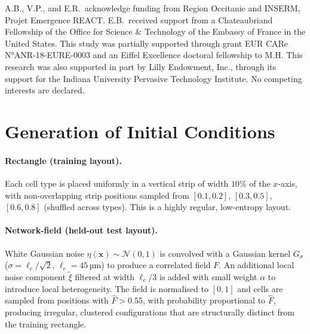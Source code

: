\documentclass{article}
\begin{document}
\begin{ack}
A.B., V.P., and E.R.\ acknowledge funding from Region Occitanie and INSERM,
Projet Emergence REACT.
E.B.\ received support from a Chateaubriand Fellowship of the Office for
Science \& Technology of the Embassy of France in the United States.
This study was partially supported through grant EUR CARe N°ANR-18-EURE-0003
and an Eiffel Excellence doctoral fellowship to M.H.
This research was also supported in part by Lilly Endowment, Inc., through its
support for the Indiana University Pervasive Technology Institute.
No competing interests are declared.
\end{ack}




\appendix

\section{Generation of Initial Conditions}
\label{app:ic}

\paragraph{Rectangle (training layout).}
Each cell type is placed uniformly in a vertical strip of width $10\%$ of the
$x$-axis, with non-overlapping strip positions sampled from $[0.1,0.2]$,
$[0.3,0.5]$, $[0.6,0.8]$ (shuffled across types). This is a highly regular,
low-entropy layout.

\paragraph{Network-field (held-out test layout).}
White Gaussian noise $\eta(\mathbf{x})\sim\mathcal{N}(0,1)$ is convolved
with a Gaussian kernel $G_\sigma$ ($\sigma=\ell_c/\sqrt{2}$,
$\ell_c=45$\,µm) to produce a correlated field $F$.
An additional local noise component $\tilde\xi$ filtered at width
$\ell_c/3$ is added with small weight $\alpha$ to introduce local
heterogeneity.
The field is normalised to $[0,1]$ and cells are sampled from positions
with $\hat{F}>0.55$, with probability proportional to $\hat{F}$, producing
irregular, clustered configurations that are structurally distinct from the
training rectangle.
\end{document}
